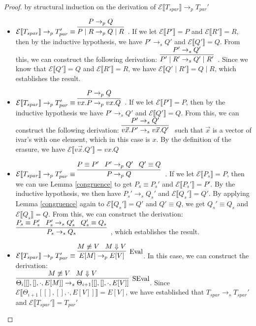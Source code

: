 \documentclass[9pt]{article}
\newcommand\specStep{\rightarrow_{s}}
\newcommand\parStep{\rightarrow_{p}}
\newcommand{\eval}[1]{E[#1]}
\newcommand{\erase}[1]{\mathcal{E}\llbracket #1 \rrbracket}
\begin{document}
\begin{proof}
by structural induction on the derivation of $\erase{T_{spar} }\parStep T_{par}'$

\begin{itemize}

\item $\erase{T_{spar} }\parStep T_{par}' \equiv \infer[]{P \; | \; R \parStep Q \; | \; R}{P \parStep Q}$.  If we let $\erase{P'} =  P$ and $\erase{R'} = R$, then by the inductive hypothesis, we have $P' \specStep Q'$ and $\erase{Q'} = Q$.  From this, we can construct the following derivation: $\infer[]{P' \; | \; R' \specStep Q' \; | \; R'}{P' \specStep Q'}$.  Since we know that $\erase{Q'} = Q$ and $\erase{R'} = R$, we have $\erase{Q' \; | \; R'} = Q \; | \; R$, which establishes the result.

\item $\erase{T_{spar} }\parStep T_{par}' \equiv \infer[]{vx.P \parStep vx.Q}{P \parStep Q}$.  If we let $\erase{P'} = P$, then by the inductive hypothesis we have $P' \specStep Q'$ and $\erase{Q'} = Q$.  From this, we can construct the following derivation: $\infer[]{v\vec{x}.P' \specStep v\vec{x}.Q'}{P' \specStep Q'}$ such that $\vec{x}$ is a vector of ivar's with one element, which in this case is $x$.  By the definition of the erasure, we have $\erase{v\vec{x}.Q'} = vx.Q$

\item $\erase{T_{spar} }\parStep T_{par}' \equiv \infer[]{P \parStep Q}{P \equiv P' \;\;\; P' \parStep Q' \;\;\; Q' \equiv Q}$.  If we let $\erase{P_s} = P$, then we can use Lemma \ref{congruence} to get $P_s \equiv P_s'$ and $\erase{P_s'} = P'$.  By the inductive hypothesis, we then have $P_s' \specStep Q_s'$ and $\erase{Q_s'} = Q'$.  By applying Lemma \ref{congruence} again to $\erase{Q_s'} = Q'$ and $Q' \equiv Q$, we get $Q_s' \equiv Q_s$ and $\erase{Q_s} = Q$.  From this, we can construct the derivation: $\infer[]{P_s \specStep Q_s}{P_s \equiv P_s' \;\;\; P_s' \specStep Q_s' \;\;\; Q_s' \equiv Q_s}$, which establishes the result.

\item $\erase{T_{spar} }\parStep T_{par}' \equiv \infer[\text{Eval}]{\eval{M} \parStep \eval{V}}{M \not\equiv V \;\;\; M \Downarrow V}$.  In this case, we can construct the derivation: \\$\infer[\text{SEval}]{\Theta_i[[], [], \cdot, \eval{M}] \specStep \Theta_{i+1}[[], [], \cdot, \eval{V}]}{M \not\equiv V \;\;\; M \Downarrow V} $.  Since $\erase{\Theta_{i+1}[[], [], \cdot, \eval{V}]} = \eval{V}$, we have established that $T_{spar} \specStep T_{spar}'$ and $\erase{T_{spar}'} = T_{par}'$


\end{itemize}
\end{proof}
\end{document}
